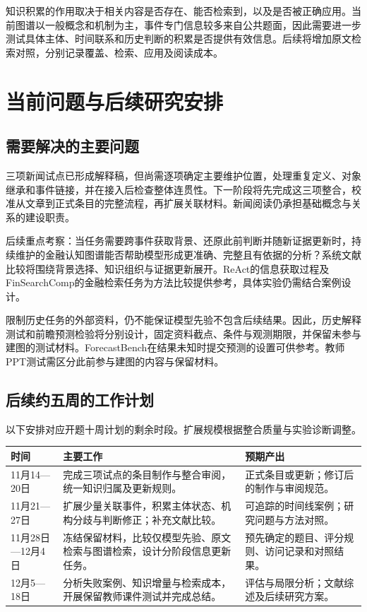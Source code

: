 \documentclass[11pt,letterpaper]{article}
\begin{document}
知识积累的作用取决于相关内容是否存在、能否检索到，以及是否被正确应用。当前图谱以一般概念和机制为主，事件专门信息较多来自公共题面，因此需要进一步测试具体主体、时间联系和历史判断的积累是否提供有效信息。后续将增加原文检索对照，分别记录覆盖、检索、应用及阅读成本。

\newpage
\section{当前问题与后续研究安排}

\subsection{需要解决的主要问题}

三项新闻试点已形成解释稿，但尚需逐项确定主要维护位置，处理重复定义、对象继承和事件链接，并在接入后检查整体连贯性。下一阶段将先完成这三项整合，校准从文章到正式条目的完整流程，再扩展关联材料。新闻阅读仍承担基础概念与关系的建设职责。

后续重点考察：当任务需要跨事件获取背景、还原此前判断并随新证据更新时，持续维护的金融认知图谱能否帮助模型形成更准确、完整且有依据的分析？系统文献比较将围绕背景选择、知识组织与证据更新展开。ReAct的信息获取过程\cite{react}及FinSearchComp的金融检索任务\cite{finsearch}为方法比较提供参考，具体实验仍需结合案例设计。

限制历史任务的外部资料，仍不能保证模型先验不包含后续结果。因此，历史解释测试和前瞻预测检验将分别设计，固定资料截点、条件与观测期限，并保留未参与建图的测试材料。ForecastBench在结果未知时提交预测的设置\cite{forecastbench}可供参考。教师PPT测试需区分此前参与建图的内容与保留材料。

\subsection{后续约五周的工作计划}

以下安排对应开题十周计划的剩余时段。扩展规模根据整合质量与实验诊断调整。

\begin{center}
\small
\begin{tabularx}{\textwidth}{@{}L{0.16\textwidth}Y L{0.28\textwidth}@{}}
\toprule
时间 & 主要工作 & 预期产出 \\
\midrule
11月14—20日 & 完成三项试点的条目制作与整合审阅，统一知识归属及更新规则。 & 正式条目或更新；修订后的制作与审阅规范。 \\
11月21—27日 & 扩展少量关联事件，积累主体状态、机构分歧与判断修正；补充文献比较。 & 可追踪的时间线案例；研究问题与方法对照。 \\
11月28日—12月4日 & 冻结保留材料，比较仅模型先验、原文检索与图谱检索，设计分阶段信息更新任务。 & 预先确定的题目、评分规则、访问记录和对照结果。 \\
12月5—18日 & 分析失败案例、知识增量与检索成本，开展保留教师课件测试并完成总结。 & 评估与局限分析；文献综述及后续研究方案。 \\
\bottomrule
\end{tabularx}
\end{center}
\end{document}

